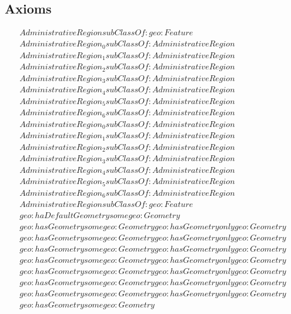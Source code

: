 \subsection{Axioms}
\begin{align}
  AdministrativeRegion subClassOf: geo:Feature\\
  AdministrativeRegion_0 subClassOf: AdministrativeRegion\\
  AdministrativeRegion_1 subClassOf: AdministrativeRegion\\
  AdministrativeRegion_2 subClassOf: AdministrativeRegion\\
  AdministrativeRegion_3 subClassOf: AdministrativeRegion\\
  AdministrativeRegion_4 subClassOf: AdministrativeRegion\\
  AdministrativeRegion_5 subClassOf: AdministrativeRegion\\
  AdministrativeRegion_6 subClassOf: AdministrativeRegion\\
  AdministrativeRegion_0 subClassOf: AdministrativeRegion\\
  AdministrativeRegion_1 subClassOf: AdministrativeRegion\\
  AdministrativeRegion_2 subClassOf: AdministrativeRegion\\
  AdministrativeRegion_3 subClassOf: AdministrativeRegion\\
  AdministrativeRegion_4 subClassOf: AdministrativeRegion\\
  AdministrativeRegion_5 subClassOf: AdministrativeRegion\\
  AdministrativeRegion_6 subClassOf: AdministrativeRegion\\
  AdministrativeRegion subClassOf: geo:Feature\\
  geo:haDefaultGeometry some geo:Geometry \\
  geo:hasGeometry some geo:Geometry   geo:hasGeometry only geo:Geometry \\
  geo:hasGeometry some geo:Geometry   geo:hasGeometry only geo:Geometry \\
  geo:hasGeometry some geo:Geometry   geo:hasGeometry only geo:Geometry \\
  geo:hasGeometry some geo:Geometry   geo:hasGeometry only geo:Geometry \\
  geo:hasGeometry some geo:Geometry   geo:hasGeometry only geo:Geometry \\
  geo:hasGeometry some geo:Geometry   geo:hasGeometry only geo:Geometry \\
  geo:hasGeometry some geo:Geometry   geo:hasGeometry only geo:Geometry \\
  geo:hasGeometry some geo:Geometry \end{align}



